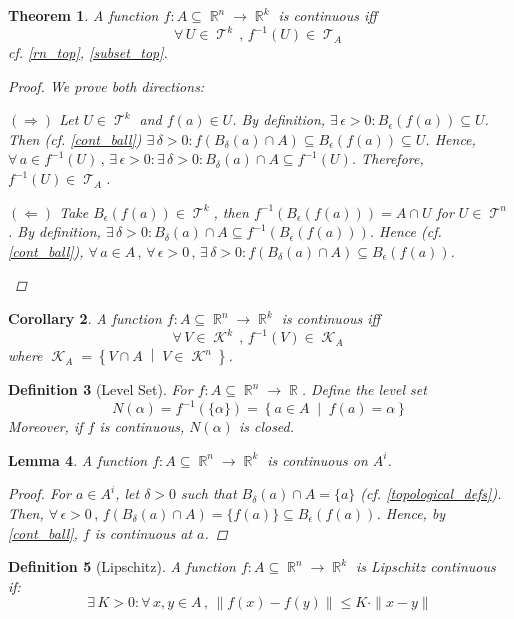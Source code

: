 \documentclass[12pt]{article}
\let\RA\Rightarrow
\let\LA\Leftarrow
\let\ee\epsilon
\newcommand{\set}[2]{\left\{{#1}\;\middle|\;{#2}\right\}}
\newcommand{\Forall}[1]{\forall\,{#1}\,,\,}
\newcommand{\Exist}[1]{\exists\,{#1}:}
\DeclareMathOperator{\R}{\mathbb{R}}
\DeclareMathOperator{\T}{\mathcal{T}}
\DeclareMathOperator{\K}{\mathcal{K}}
\newtheorem{theorem}{Theorem}[subsection]
\newtheorem{definition}[theorem]{Definition}
\newtheorem{lemma}[theorem]{Lemma}
\newtheorem{corollary}[theorem]{Corollary}
\begin{document}
\begin{theorem}
  A function $f:A\subseteq \R^n\to \R^k$ is continuous iff $$\Forall{U\in\T^k}f^{-1}(U)\in \T_A$$ cf. \ref{rn_top}, \ref{subset_top}.
  \begin{proof}
    We prove both directions:
    \begin{compactitem}
      \item[$(\RA)$] Let $U\in\T^k$ and $f(a)\in U$. By definition, $\Exist{\ee>0}B_\ee(f(a))\subseteq U$. Then (cf. \ref{cont_ball}) $\Exist{\delta>0}f(B_\delta(a)\cap A)\subseteq B_\ee(f(a))\subseteq U$. Hence, $\Forall{a\in f^{-1}(U)}\Exist{\ee>0}\Exist{\delta>0} B_\delta(a)\cap A\subseteq f^{-1}(U)$. Therefore, $f^{-1}(U)\in\T_A$.
      \item[$(\LA)$] Take $B_\ee(f(a))\in\T^k$, then $f^{-1}(B_\ee(f(a)))=A\cap U$ for $U\in\T^n$. By definition, $\Exist{\delta>0}B_\delta(a)\cap A\subseteq f^{-1}(B_\ee(f(a)))$. Hence (cf. \ref{cont_ball}), $\Forall{a\in A}\Forall{\ee>0}\Exist{\delta>0}f(B_\delta(a)\cap A)\subseteq B_\ee(f(a))$.
    \end{compactitem}
  \end{proof}
\end{theorem}

\begin{corollary}
  A function $f:A\subseteq \R^n\to \R^k$ is continuous iff $$\Forall{V\in\K^k}f^{-1}(V)\in \K_A$$
  where $\K_A=\set{V\cap A}{V\in\K^n}$.
\end{corollary}

\begin{definition}[Level Set]
  \label{def_level_set}
  For $f:A\subseteq \R^n\to\R$. Define the level set $$N(\alpha)=f^{-1}(\{\alpha\})=\set{a\in A}{f(a)=\alpha}$$ Moreover, if $f$ is continuous, $N(\alpha)$ is closed.
\end{definition}

\begin{lemma}
  A function $f:A\subseteq \R^n\to \R^k$ is continuous on $A^i$.
  \begin{proof}
    For $a\in A^i$, let $\delta>0$ such that $B_\delta(a)\cap A=\{a\}$ (cf. \ref{topological_defs}). Then, $\Forall{\ee>0}f(B_\delta(a)\cap A)=\{f(a)\}\subseteq B_\ee(f(a))$. Hence, by \ref{cont_ball}, $f$ is continuous at $a$.
  \end{proof}
\end{lemma}

\begin{definition}[Lipschitz]
  A function $f:A\subseteq\R^n\to\R^k$ is Lipschitz continuous if: $$\Exist{K>0}\Forall{x,y\in A}\|f(x)-f(y)\|\leq K\cdot\|x-y\|$$
\end{definition}
\end{document}
